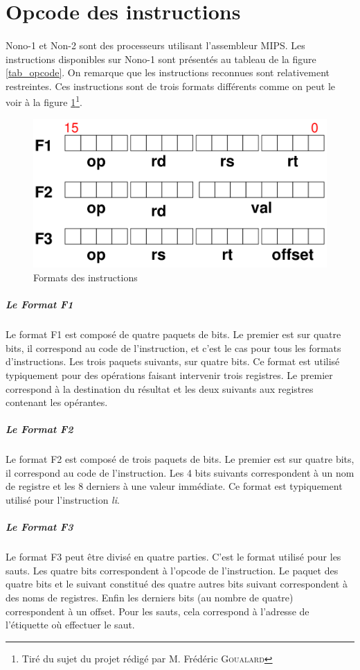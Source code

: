 \documentclass[a4paper]{article}
\begin{document}
		\section{Opcode des instructions}
			
			\paragraph{}{
			Nono-1 et Non-2 sont des processeurs utilisant l'assembleur MIPS. Les 
			instructions disponibles sur Nono-1 sont présentés au tableau de la figure
			\ref{tab_opcode}. On remarque que les instructions reconnues sont relativement
			restreintes. Ces instructions sont de trois formats différents comme on peut
			le voir à la figure \ref{format_inst}\footnote{Tiré du sujet du projet rédigé par M. Frédéric \textsc{Goualard}}.
			}
			
			\begin{figure}[!ht]
			\centering
			\includegraphics[scale=0.2]{formats_instructions.png}
			\caption{\label{format_inst} Formats des instructions}
			\end{figure}
			
				\subparagraph{Le Format F1}{
				Le format F1 est composé de quatre paquets de bits.
				Le premier est sur quatre bits, il correspond au code de l'instruction,
				et c'est le cas pour tous les formats d'instructions.
				Les trois paquets suivants, sur quatre bits. Ce format est utilisé typiquement
				pour des opérations faisant intervenir trois registres. Le premier correspond
				à la destination du résultat et les deux suivants aux registres contenant les
				opérantes.
				}
				\subparagraph{Le Format F2}{
				Le format F2 est composé de trois paquets de bits.
				Le premier est sur quatre bits, il correspond au code de l'instruction.
				Les 4 bits suivants correspondent à un nom de registre et les 8 derniers
				à une valeur immédiate. Ce format est typiquement utilisé pour l'instruction
				\textit{li}.
				}
				\subparagraph{Le Format F3}{
				Le format F3 peut être divisé en quatre parties. C'est le format utilisé
				pour les sauts. Les quatre bits correspondent à l'opcode de l'instruction.
				Le paquet des quatre bits et le suivant constitué des quatre autres bits
				suivant correspondent à des noms de registres. Enfin les derniers bits (au
				nombre de quatre) correspondent à un offset. Pour les sauts, cela correspond
				à l'adresse de l'étiquette où effectuer le saut. 
				}
			
\end{document}
